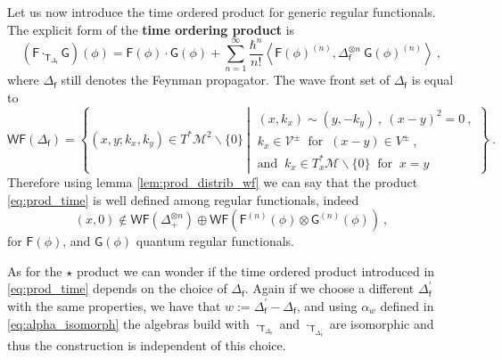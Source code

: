 \documentclass[11pt]{book}
\newcommand{\WF}{\mathsf{WF}}
\newcommand{\sm}[1]{\left\langle#1\right\rangle}
\newcommand{\Mcal}{\mathcal{M}}
\newcommand{\Vcal}{\mathcal{V}}
\newcommand{\Fsf}{\mathsf{F}}
\newcommand{\Gsf}{\mathsf{G}}
\newcommand{\Tsf}{\mathsf{T}}
\newcommand{\fsf}{\mathsf{f}}
\theoremstyle{break}
\begin{document}
Let us now introduce the time ordered product for generic regular functionals. The explicit form of the \textbf{time ordering product} is
%
\begin{equation}
(\Fsf \cdot_{\Tsf_{\Delta_\fsf}}  \Gsf)(\phi) = \Fsf(\phi) \cdot \Gsf(\phi) + \sum_{n=1}^\infty \frac{\hbar^n}{n!} \sm{ \Fsf(\phi)^{(n)} , \Delta_\fsf^{\otimes n} \ \Gsf(\phi)^{(n)} } \ ,
\label{eq:prod_time}
\end{equation}
%
where $\Delta_\fsf$ still denotes the Feynman propagator. The wave front set of $\Delta_\fsf$ is equal to
%
\begin{equation}
\WF(\Delta_\fsf) = \left\{ \left(x,y;k_x,k_y\right) \in T^{\ast}\Mcal^{2} \backslash\{0\} \ \left| \ 
\begin{array}{l}
(x,k_x) \sim (y,-k_y) \ , \  (x-y)^2=0 \ , \\[2pt]
k_x \in \Vcal^\pm \ \mbox{ for } \ (x-y) \in V^\pm \ , \\[2pt]
\mbox{and } \ k_x \in T^{\ast}_x\Mcal \backslash\{0\} \ \mbox{ for } \ x = y
\end{array}
\right. \right\} \ .
\end{equation}
%
Therefore using lemma \ref{lem:prod_distrib_wf} we can say that the product \eqref{eq:prod_time} is well defined among regular functionals, indeed
%
\begin{equation*}
(x,0) \notin \WF(\Delta_+^{\otimes n}) \oplus \WF\left(\Fsf^{(n)}(\phi) \otimes \Gsf^{(n)}(\phi)\right) \ ,
\end{equation*}
%
for $\Fsf(\phi)$, and $\Gsf(\phi)$ quantum regular functionals. 


\bigskip


As for the $\star$ product we can wonder if the time ordered product introduced in \eqref{eq:prod_time} depends on the choice of $\Delta_\fsf$. Again if we choose a different $\Delta^\prime_\fsf$ with the same properties, we have that $w:=\Delta^\prime_\fsf - \Delta_\fsf$, and using $\alpha_{w}$ defined in \eqref{eq:alpha_isomorph} the algebras build with $\cdot_{\Tsf_{\Delta_\fsf}}$ and $\cdot_{\Tsf_{\Delta^\prime_\fsf}}$ are isomorphic and thus the construction is independent of this choice.


\bigskip
\end{document}
